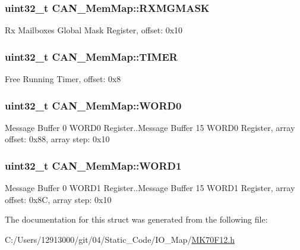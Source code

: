 \subsubsection[{R\+X\+M\+G\+M\+A\+S\+K}]{\setlength{\rightskip}{0pt plus 5cm}uint32\+\_\+t C\+A\+N\+\_\+\+Mem\+Map\+::\+R\+X\+M\+G\+M\+A\+S\+K}\label{struct_c_a_n___mem_map_aa788d49d34c42aeb411ed6b43f1a7c42}
Rx Mailboxes Global Mask Register, offset\+: 0x10 \hypertarget{struct_c_a_n___mem_map_a7cdd012a6030c4bf528cec65fddb71ca}{}
\subsubsection[{T\+I\+M\+E\+R}]{\setlength{\rightskip}{0pt plus 5cm}uint32\+\_\+t C\+A\+N\+\_\+\+Mem\+Map\+::\+T\+I\+M\+E\+R}\label{struct_c_a_n___mem_map_a7cdd012a6030c4bf528cec65fddb71ca}
Free Running Timer, offset\+: 0x8 \hypertarget{struct_c_a_n___mem_map_ac2b68cfbc9aeab141d20ae8bd73cd169}{}
\subsubsection[{W\+O\+R\+D0}]{\setlength{\rightskip}{0pt plus 5cm}uint32\+\_\+t C\+A\+N\+\_\+\+Mem\+Map\+::\+W\+O\+R\+D0}\label{struct_c_a_n___mem_map_ac2b68cfbc9aeab141d20ae8bd73cd169}
Message Buffer 0 W\+O\+R\+D0 Register..Message Buffer 15 W\+O\+R\+D0 Register, array offset\+: 0x88, array step\+: 0x10 \hypertarget{struct_c_a_n___mem_map_ae9343e0c532c0f3784d9960ffb8aa229}{}
\subsubsection[{W\+O\+R\+D1}]{\setlength{\rightskip}{0pt plus 5cm}uint32\+\_\+t C\+A\+N\+\_\+\+Mem\+Map\+::\+W\+O\+R\+D1}\label{struct_c_a_n___mem_map_ae9343e0c532c0f3784d9960ffb8aa229}
Message Buffer 0 W\+O\+R\+D1 Register..Message Buffer 15 W\+O\+R\+D1 Register, array offset\+: 0x8\+C, array step\+: 0x10 

The documentation for this struct was generated from the following file\+:\begin{DoxyCompactItemize}
\item 
C\+:/\+Users/12913000/git/04/\+Static\+\_\+\+Code/\+I\+O\+\_\+\+Map/\hyperlink{_m_k70_f12_8h}{M\+K70\+F12.\+h}\end{DoxyCompactItemize}
